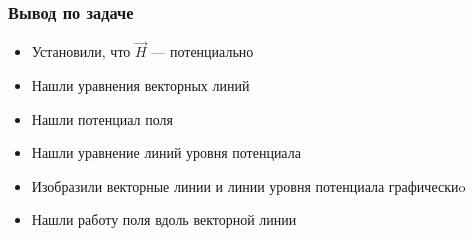 \begin{frame}\frametitle{Вывод по задаче}
	\begin{itemize}
		\item Установили, что \(\vec H\) --- потенциально
		\item Нашли уравнения векторных линий
		\item Нашли потенциал поля
		\item Нашли уравнение линий уровня потенциала
		\item Изобразили векторные линии и линии уровня потенциала графическиo
		\item Нашли работу поля вдоль векторной линии
	\end{itemize}
\end{frame}
